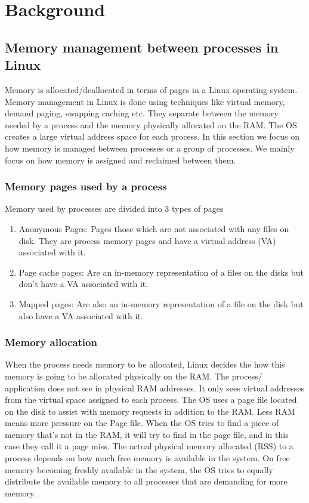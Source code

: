 \chapter{Background}

  
  \section{Memory management between processes in Linux}
  
    Memory is allocated/deallocated in terms of pages in a Linux operating system. Memory management in Linux is done using techniques like 
virtual memory, demand paging, swapping caching etc. They separate between the memory needed by a process and the memory physically 
allocated on the RAM. The OS creates a large virtual address space for each process. In this section we focus on how memory is managed 
between processes or a group of processes. We mainly focus on how memory is assigned and reclaimed between them.  
  
    \subsection{Memory pages used by a process}
      Memory used by processes are divided into 3 types of pages	
      \begin{enumerate}	
	\item Anonymous Pages: Pages those which are not associated with any files on disk. They are process memory pages and have a virtual
	address (VA) associated with it.
	\item Page cache pages: Are an in-memory representation of a files on the disks but don't have a VA associated with it.	
	\item Mapped pages: Are also an in-memory representation of a file on the disk but also have a VA associated with it.
      \end{enumerate}
  
    \subsection{Memory allocation}
      When the process needs memory to be allocated, Linux decides the how this memory is going to be allocated physically on the RAM. The 
process/ application does not see in physical RAM addresses. It only sees virtual addresses from the virtual space assigned to each process.
The OS uses a page file located on the disk to assist with memory requests in addition to the RAM. Less RAM means more pressure on the Page 
file. When the OS tries to find a piece of memory that's not in the RAM, it will try to find in the page file, and in this case they call it 
a page miss. The actual physical memory allocated (RSS) to a process depends on how much free memory is available in the system. On free 
memory becoming freshly available in the system, the OS tries to equally distribute the available memory to all processes that are 
demanding for more memory.


